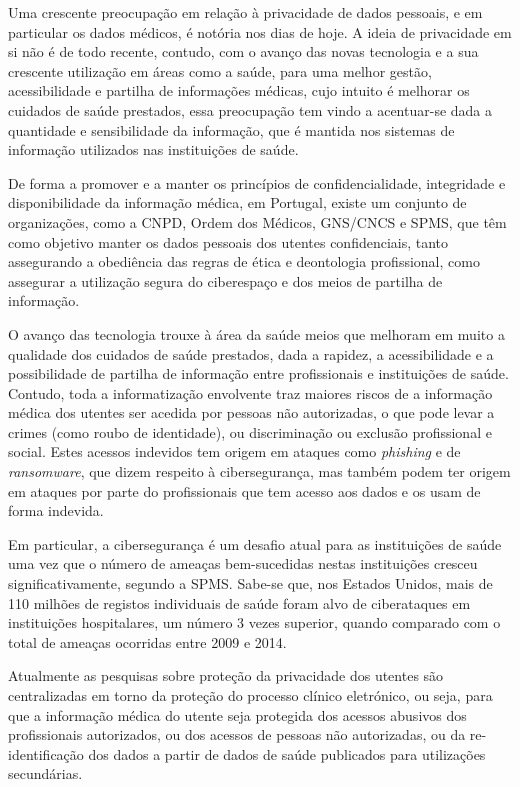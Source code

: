 \documentclass[conference]{IEEEtran}
\begin{document}
Uma crescente preocupação em relação à privacidade de dados pessoais, e em particular os dados médicos, é notória nos dias de hoje. A ideia de privacidade em si não é de todo recente, contudo, com o avanço das novas tecnologia e a sua crescente utilização em áreas como a saúde, para uma melhor gestão, acessibilidade e partilha de informações médicas, cujo intuito é melhorar os cuidados de saúde prestados, essa preocupação tem vindo a acentuar-se dada a quantidade e sensibilidade da informação, que é mantida nos sistemas de informação utilizados nas instituições de saúde.

De forma a promover e a manter os princípios de confidencialidade, integridade e disponibilidade da informação médica, em Portugal, existe um conjunto de organizações, como a CNPD, Ordem dos Médicos, GNS/CNCS e SPMS, que têm como objetivo manter os dados pessoais dos utentes confidenciais, tanto assegurando a obediência das regras de ética e deontologia profissional, como assegurar a utilização segura do ciberespaço e dos meios de partilha de informação.

O avanço das tecnologia trouxe à área da saúde meios que melhoram em muito a qualidade dos cuidados de saúde prestados, dada a rapidez, a acessibilidade e a possibilidade de partilha de informação entre profissionais e instituições de saúde. Contudo, toda a informatização envolvente traz maiores riscos de a informação médica dos utentes ser acedida por pessoas não autorizadas, o que pode levar a crimes (como roubo de identidade), ou discriminação ou exclusão profissional e social. Estes acessos indevidos tem origem em ataques como \textit{phishing} e de \textit{ransomware}, que dizem respeito à cibersegurança, mas também podem ter origem em ataques por parte do profissionais que tem acesso aos dados e os usam de forma indevida.

Em particular, a cibersegurança é um desafio atual para as instituições de saúde uma vez que o número de ameaças bem-sucedidas nestas instituições cresceu significativamente, segundo a SPMS. Sabe-se que, nos Estados Unidos, mais de 110 milhões de registos individuais de saúde foram alvo de ciberataques em instituições hospitalares, um número 3 vezes superior, quando comparado com o total de ameaças ocorridas entre 2009 e 2014.

Atualmente as pesquisas sobre proteção da privacidade dos utentes são centralizadas em torno da proteção do processo clínico eletrónico, ou seja, para que a informação médica do utente seja protegida dos acessos abusivos dos profissionais autorizados, ou dos acessos de pessoas não autorizadas, ou da re-identificação dos dados a partir de dados de saúde publicados para utilizações secundárias.
\end{document}

